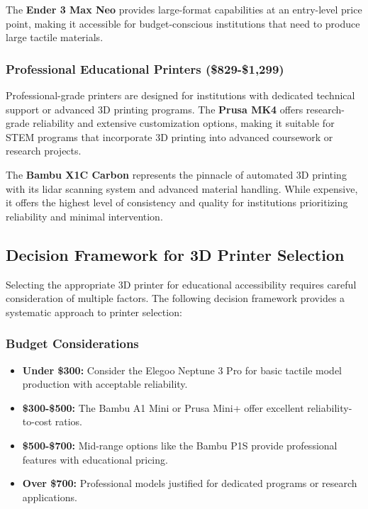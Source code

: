The \textbf{Ender 3 Max Neo} provides large-format capabilities at an entry-level price point, making it accessible for budget-conscious institutions that need to produce large tactile materials.

\subsubsection{Professional Educational Printers (\$829-\$1,299)}
Professional-grade printers are designed for institutions with dedicated technical support or advanced 3D printing programs. The \textbf{Prusa MK4} offers research-grade reliability and extensive customization options, making it suitable for STEM programs that incorporate 3D printing into advanced coursework or research projects.

The \textbf{Bambu X1C Carbon} represents the pinnacle of automated 3D printing with its lidar scanning system and advanced material handling. While expensive, it offers the highest level of consistency and quality for institutions prioritizing reliability and minimal intervention.

\subsection{Decision Framework for 3D Printer Selection}\label{ch5:subsec:decision-framework}

Selecting the appropriate 3D printer for educational accessibility requires careful consideration of multiple factors. The following decision framework provides a systematic approach to printer selection:

\subsubsection{Budget Considerations}
\begin{itemize}
	\item \textbf{Under \$300:} Consider the Elegoo Neptune 3 Pro for basic tactile model production with acceptable reliability.
	\item \textbf{\$300-\$500:} The Bambu A1 Mini or Prusa Mini+ offer excellent reliability-to-cost ratios.
	\item \textbf{\$500-\$700:} Mid-range options like the Bambu P1S provide professional features with educational pricing.
	\item \textbf{Over \$700:} Professional models justified for dedicated programs or research applications.
\end{itemize}

